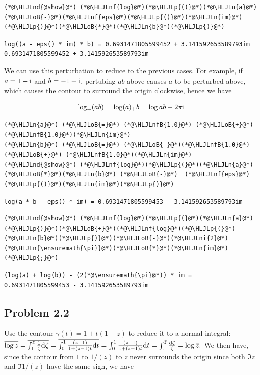 \documentclass[12pt,a4paper]{article}
\newcommand{\HLJLn}[1]{#1}
\newcommand{\HLJLnd}[1]{\textcolor[RGB]{214,102,97}{#1}}
\newcommand{\HLJLnf}[1]{\textcolor[RGB]{66,102,213}{#1}}
\newcommand{\HLJLnfB}[1]{\textcolor[RGB]{59,151,46}{#1}}
\newcommand{\HLJLni}[1]{\textcolor[RGB]{59,151,46}{#1}}
\newcommand{\HLJLoB}[1]{\textcolor[RGB]{102,102,102}{\textbf{#1}}}
\newcommand{\HLJLp}[1]{#1}
\def\D{ {\rm d} }
\def\I{ {\rm i} }
\def\dt{\D t}
\begin{document}
\begin{lstlisting}
(*@\HLJLnd{@show}@*) (*@\HLJLnf{log}@*)(*@\HLJLp{((}@*)(*@\HLJLn{a}@*)(*@\HLJLoB{-}@*)(*@\HLJLnf{eps}@*)(*@\HLJLp{()}@*)(*@\HLJLn{im}@*)(*@\HLJLp{)}@*)(*@\HLJLoB{*}@*)(*@\HLJLn{b}@*)(*@\HLJLp{)}@*)
\end{lstlisting}

\begin{lstlisting}
log((a - eps() * im) * b) = 0.6931471805599452 + 3.141592653589793im
0.6931471805599452 + 3.141592653589793im
\end{lstlisting}


We can use this perturbation to reduce to the previous cases. For example, if $a = 1 + \I$ and $b = -1 + \I$, pertubing $ab$ above causes $a$ to be perturbed  above, which causes the contour to surround the origin clockwise, hence we have

\[
\log_+(ab) = \log(a)_+b = \log a b - 2 \pi \I
\]

\begin{lstlisting}
(*@\HLJLn{a}@*) (*@\HLJLoB{=}@*) (*@\HLJLnfB{1.0}@*) (*@\HLJLoB{+}@*) (*@\HLJLnfB{1.0}@*)(*@\HLJLn{im}@*)
(*@\HLJLn{b}@*) (*@\HLJLoB{=}@*) (*@\HLJLoB{-}@*)(*@\HLJLnfB{1.0}@*) (*@\HLJLoB{+}@*) (*@\HLJLnfB{1.0}@*)(*@\HLJLn{im}@*)
(*@\HLJLnd{@show}@*) (*@\HLJLnf{log}@*)(*@\HLJLp{(}@*)(*@\HLJLn{a}@*)(*@\HLJLoB{*}@*)(*@\HLJLn{b}@*) (*@\HLJLoB{-}@*)  (*@\HLJLnf{eps}@*)(*@\HLJLp{()}@*)(*@\HLJLn{im}@*)(*@\HLJLp{)}@*)
\end{lstlisting}

\begin{lstlisting}
log(a * b - eps() * im) = 0.6931471805599453 - 3.141592653589793im
\end{lstlisting}


\begin{lstlisting}
(*@\HLJLnd{@show}@*) (*@\HLJLnf{log}@*)(*@\HLJLp{(}@*)(*@\HLJLn{a}@*)(*@\HLJLp{)}@*)(*@\HLJLoB{+}@*)(*@\HLJLnf{log}@*)(*@\HLJLp{(}@*)(*@\HLJLn{b}@*)(*@\HLJLp{)}@*)(*@\HLJLoB{-}@*)(*@\HLJLni{2}@*)(*@\HLJLn{\ensuremath{\pi}}@*)(*@\HLJLoB{*}@*)(*@\HLJLn{im}@*)(*@\HLJLp{;}@*)
\end{lstlisting}

\begin{lstlisting}
(log(a) + log(b)) - (2(*@\ensuremath{\pi}@*)) * im = 0.6931471805599453 - 3.141592653589793im
\end{lstlisting}


\subsection{Problem 2.2}
Use the contour $\gamma(t) = 1 + t(1-z)$ to reduce it to a normal integral: $\overline{\log z } = \overline{\int_1^z {1 \over \zeta} \D \zeta} = \overline{\int_0^1 {(z-1) \over 1+(z-1) t} \dt}  = \int_0^1 {(\bar z-1) \over 1+(\bar z-1) t} \dt = \int_1^{\bar z} {\D \zeta \over \zeta} = \log \bar z.$ We then have, since the contour from $1$ to $1/(\bar z)$ to $z$ never surrounds the origin since both $\Im z$ and $\Im 1/(\bar z)$ have the same sign, we have 
\end{document}
